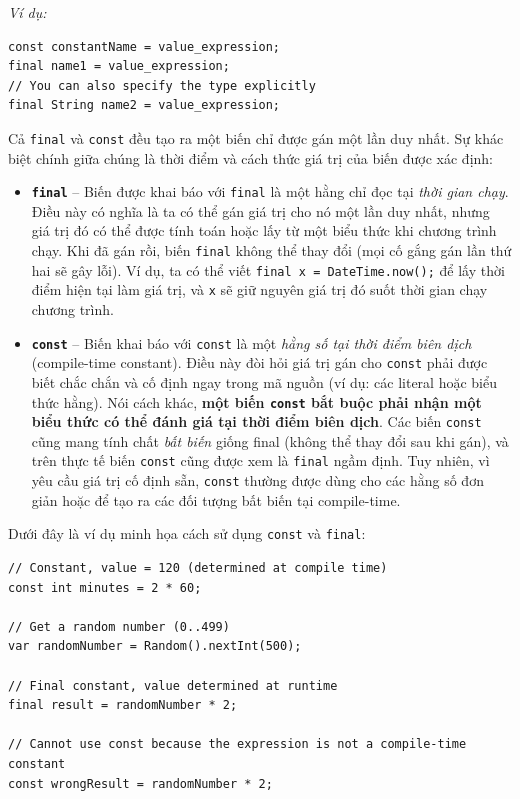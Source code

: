 \documentclass[../DoAn.tex]{subfiles}
\numberwithin{figure}{chapter}
\begin{document}
\textit{Ví dụ:} 
\begin{lstlisting}
const constantName = value_expression;
final name1 = value_expression;
// You can also specify the type explicitly
final String name2 = value_expression;
\end{lstlisting}

Cả \texttt{final} và \texttt{const} đều tạo ra một biến chỉ được gán một lần duy nhất. Sự khác biệt chính giữa chúng là thời điểm và cách thức giá trị của biến được xác định: 
\begin{itemize}
  \item \textbf{\texttt{final}} – Biến được khai báo với \texttt{final} là một hằng chỉ đọc tại \textit{thời gian chạy}. Điều này có nghĩa là ta có thể gán giá trị cho nó một lần duy nhất, nhưng giá trị đó có thể được tính toán hoặc lấy từ một biểu thức khi chương trình chạy. Khi đã gán rồi, biến \texttt{final} không thể thay đổi (mọi cố gắng gán lần thứ hai sẽ gây lỗi). Ví dụ, ta có thể viết \texttt{final x = DateTime.now();} để lấy thời điểm hiện tại làm giá trị, và \texttt{x} sẽ giữ nguyên giá trị đó suốt thời gian chạy chương trình.
  \item \textbf{\texttt{const}} – Biến khai báo với \texttt{const} là một \textit{hằng số tại thời điểm biên dịch} (compile-time constant). Điều này đòi hỏi giá trị gán cho \texttt{const} phải được biết chắc chắn và cố định ngay trong mã nguồn (ví dụ: các literal hoặc biểu thức hằng). Nói cách khác, \textbf{một biến \texttt{const} bắt buộc phải nhận một biểu thức có thể đánh giá tại thời điểm biên dịch}. Các biến \texttt{const} cũng mang tính chất \textit{bất biến} giống final (không thể thay đổi sau khi gán), và trên thực tế biến \texttt{const} cũng được xem là \texttt{final} ngầm định. Tuy nhiên, vì yêu cầu giá trị cố định sẵn, \texttt{const} thường được dùng cho các hằng số đơn giản hoặc để tạo ra các đối tượng bất biến tại compile-time.
\end{itemize}

Dưới đây là ví dụ minh họa cách sử dụng \texttt{const} và \texttt{final}: 

\begin{lstlisting}
// Constant, value = 120 (determined at compile time)
const int minutes = 2 * 60;   

// Get a random number (0..499)
var randomNumber = Random().nextInt(500);    

// Final constant, value determined at runtime
final result = randomNumber * 2;        

// Cannot use const because the expression is not a compile-time constant
const wrongResult = randomNumber * 2;  
\end{lstlisting}
\end{document}
